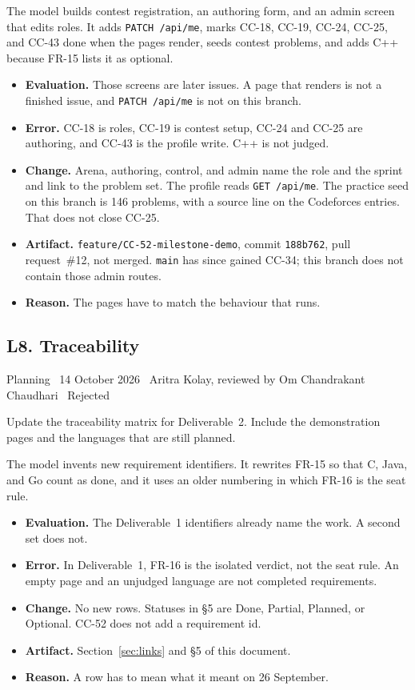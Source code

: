 \documentclass[11pt,a4paper]{article}
\newcommand{\meta}[1]{{\footnotesize\color{quiet}#1}\par\vspace{0.2em}}
\newcommand{\step}[1]{\par\vspace{0.45em}{\bfseries #1}\par\vspace{0.05em}}
\begin{document}
\step{2. Reply (summarised)}
The model builds contest registration, an authoring form, and an admin screen that edits roles. It adds \texttt{PATCH /api/me}, marks CC-18, CC-19, CC-24, CC-25, and CC-43 done when the pages render, seeds contest problems, and adds C++ because FR-15 lists it as optional.

\step{3. Decision}
\begin{itemize}
\item \textbf{Evaluation.} Those screens are later issues. A page that renders is not a finished issue, and \texttt{PATCH /api/me} is not on this branch.
\item \textbf{Error.} CC-18 is roles, CC-19 is contest setup, CC-24 and CC-25 are authoring, and CC-43 is the profile write. C++ is not judged.
\item \textbf{Change.} Arena, authoring, control, and admin name the role and the sprint and link to the problem set. The profile reads \texttt{GET /api/me}. The practice seed on this branch is 146 problems, with a source line on the Codeforces entries. That does not close CC-25.
\item \textbf{Artifact.} \texttt{feature/CC-52-milestone-demo}, commit \texttt{188b762}, pull request~\#12, not merged. \texttt{main} has since gained CC-34; this branch does not contain those admin routes.
\item \textbf{Reason.} The pages have to match the behaviour that runs.
\end{itemize}

\subsection{L8. Traceability}
\meta{Planning \textperiodcentered\ 14 October 2026 \textperiodcentered\ Aritra Kolay, reviewed by Om Chandrakant Chaudhari \textperiodcentered\ Rejected}

\step{1. Prompt}
Update the traceability matrix for Deliverable~2. Include the demonstration pages and the languages that are still planned.

\step{2. Reply (summarised)}
The model invents new requirement identifiers. It rewrites FR-15 so that C, Java, and Go count as done, and it uses an older numbering in which FR-16 is the seat rule.

\step{3. Decision}
\begin{itemize}
\item \textbf{Evaluation.} The Deliverable~1 identifiers already name the work. A second set does not.
\item \textbf{Error.} In Deliverable~1, FR-16 is the isolated verdict, not the seat rule. An empty page and an unjudged language are not completed requirements.
\item \textbf{Change.} No new rows. Statuses in \S5 are Done, Partial, Planned, or Optional. CC-52 does not add a requirement id.
\item \textbf{Artifact.} Section~\ref{sec:links} and \S5 of this document.
\item \textbf{Reason.} A row has to mean what it meant on 26 September.
\end{itemize}
\end{document}
